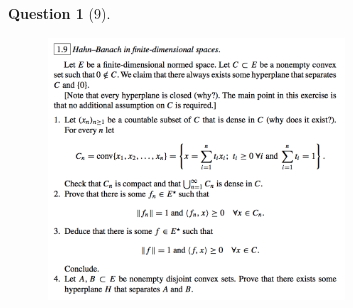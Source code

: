 \documentclass{article} %
\theoremstyle{quest}
\newtheorem*{question}{Question}
\begin{document}
\newpage

\begin{question}[9]
\hfill
\begin{figure}[h!]
  \centering
    \includegraphics[width=0.7\textwidth]{funcA-1-9.png}
\end{figure}
\end{question}
\end{document}
